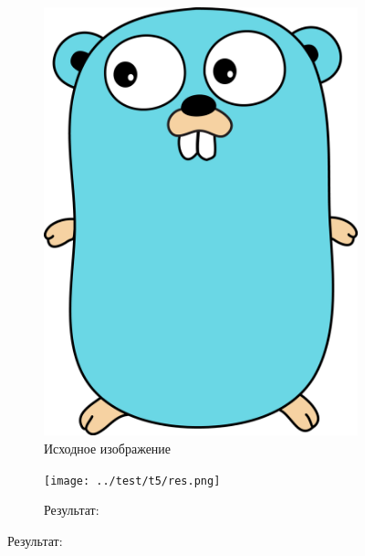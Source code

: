 \documentclass[12pt]{article}
\begin{document}
\begin{figure}[!ht]
	\begin{subfigure}{0.45\textwidth}
		\caption*{Исходное изображение}
		\includegraphics[scale=0.4]{../test/images/gopher.png}
	\end{subfigure}
	\begin{subfigure}{0.45\textwidth}
		\caption*{Результат:}
		\texttt{[image: ../test/t5/res.png]}
	\end{subfigure}
\end{figure}
\end{document}

